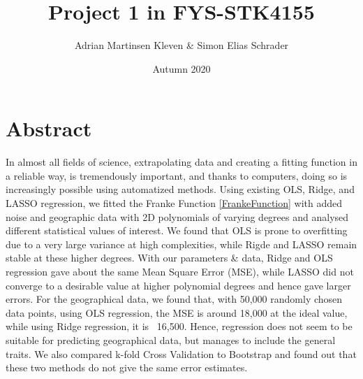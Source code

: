 \documentclass[11pt,a4paper,titlepage]{article}
\title{Project 1 in FYS-STK4155}
\author{Adrian Martinsen Kleven & Simon Elias Schrader }
\date{Autumn 2020}
\begin{document}
\maketitle
\tableofcontents
\listoffigures
\listoftables

\clearpage
\section{Abstract}
In almost all fields of science, extrapolating data and creating a fitting function in a reliable way, is tremendously important, and thanks to computers, doing so is increasingly possible using automatized methods. Using existing OLS, Ridge, and LASSO regression, we fitted the Franke Function \eqref{FrankeFunction} with added noise and geographic data with 2D polynomials of varying degrees and analysed different statistical values of interest. We found that OLS is prone to overfitting due to a very large variance at high complexities, while Rigde and LASSO remain stable at these higher degrees. With our parameters \& data, Ridge and OLS regression gave about the same Mean Square Error (MSE), while LASSO did not converge to a desirable value at higher polynomial degrees and hence gave larger errors. For the geographical data, we found that, with 50,000 randomly chosen data points, using  OLS regression, the MSE is around 18,000 at the ideal value, while using Ridge regression, it is ~16,500. Hence, regression does not seem to be suitable for predicting geographical data, but manages to include the general traits. We also compared k-fold Cross Validation to Bootstrap and found out that these two methods do not give the same error estimates. 

\end{document}
